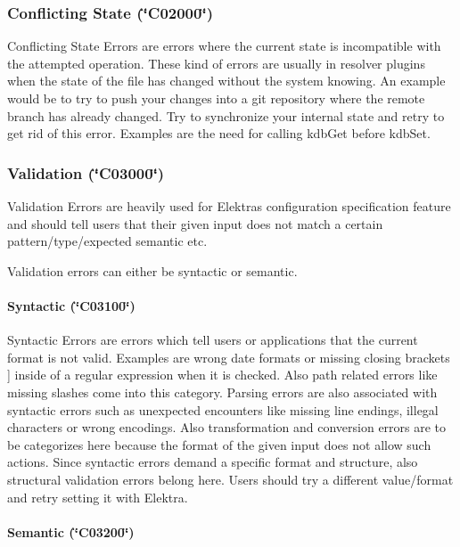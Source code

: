 \subsubsection*{Conflicting State (\char`\"{}\+C02000\char`\"{})}

{\ttfamily Conflicting State Errors} are errors where the current state is incompatible with the attempted operation. These kind of errors are usually in resolver plugins when the state of the file has changed without the system knowing. An example would be to try to push your changes into a git repository where the remote branch has already changed. Try to synchronize your internal state and retry to get rid of this error. Examples are the need for calling {\ttfamily kdb\+Get} before {\ttfamily kdb\+Set}.

\subsubsection*{Validation (\char`\"{}\+C03000\char`\"{})}

{\ttfamily Validation Errors} are heavily used for Elektra\textquotesingle{}s {\ttfamily configuration specification} feature and should tell users that their given input does not match a certain pattern/type/expected semantic etc.

Validation errors can either be syntactic or semantic.

\paragraph*{Syntactic (\char`\"{}\+C03100\char`\"{})}

{\ttfamily Syntactic Errors} are errors which tell users or applications that the current format is not valid. Examples are wrong date formats or missing closing brackets {\ttfamily \mbox{]}} inside of a regular expression when it is checked. Also path related errors like missing slashes come into this category. Parsing errors are also associated with syntactic errors such as unexpected encounters like missing line endings, illegal characters or wrong encodings. Also transformation and conversion errors are to be categorizes here because the format of the given input does not allow such actions. Since syntactic errors demand a specific format and structure, also structural validation errors belong here. Users should try a different value/format and retry setting it with Elektra.

\paragraph*{Semantic (\char`\"{}\+C03200\char`\"{})}

